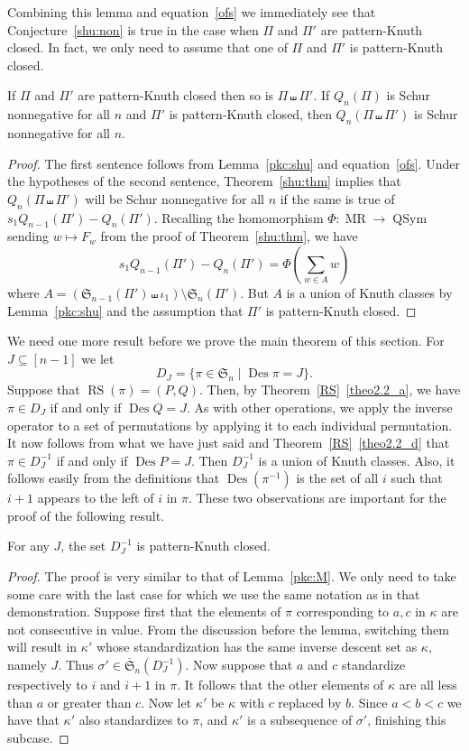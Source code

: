 \documentclass[ALCO,ThmDefs,Unicode,epreuves]{cedram}
\DeclareMathOperator{\RS}{RS}
\DeclareMathOperator{\MaR}{MR}
\newcommand{\shu}{\shuffle}
\newcommand{\ofS}{\ol{\fS}}
\newcommand{\ol}{\overline}
\newcommand{\sbe}{\subseteq}
\newcommand{\ree}[1]{\eqref{#1}}
\newcommand{\ka}{\kappa}
\newcommand{\si}{\sigma}
\newcommand{\fS}{{\mathfrak S}}
\DeclareMathOperator{\Des}{Des}
\DeclareMathOperator{\QSym}{{QSym}}
\begin{document}
Combining this lemma and equation~\ree{ofs} we immediately see that Conjecture~\ref{shu:non} is true in the case when $\Pi$ and $\Pi'$ are pattern-Knuth closed. In fact, we only need to assume that one of $\Pi$ and $\Pi'$ is pattern-Knuth closed.
\begin{prop}
If $\Pi$ and $\Pi'$ are pattern-Knuth closed then so is $\Pi\shu\Pi'$. If $Q_n(\Pi)$ is Schur nonnegative for all $n$ and $\Pi'$ is pattern-Knuth closed, then $Q_n(\Pi\shu\Pi')$ is Schur nonnegative for all $n$. %
\end{prop}

\begin{proof}
The first sentence follows from Lemma~\ref{pkc:shu} and equation~\ree{ofs}. Under the hypotheses of the second sentence, Theorem~\ref{shu:thm} implies that $Q_n(\Pi \shu \Pi')$ will be Schur nonnegative for all $n$ if the same is true of $s_1 Q_{n-1}(\Pi') - Q_n(\Pi')$. Recalling the homomorphism $\Phi : \MaR \to \QSym$ sending $w \mapsto F_w$ from the proof of Theorem~\ref{shu:thm}, we have
\[
s_1 Q_{n-1}(\Pi') - Q_n(\Pi') = \Phi\left(\sum_{w \in A} w\right)
\]
where $A = (\fS_{n-1}(\Pi') \shu \iota_1) \setminus \fS_{n}(\Pi')$. But $A$ is a union of Knuth classes by Lemma~\ref{pkc:shu} and the assumption that $\Pi'$ is pattern-Knuth closed.
\end{proof}

We need one more result before we prove the main theorem of this section. For $J\sbe [n-1]$ we let
\[
D_J =\{\pi\in\fS_n \mid \Des\pi= J\}.
\]
Suppose that $\RS(\pi)=(P,Q)$. Then, by Theorem~\ref{RS}~\eqref{theo2.2_a}, we have $\pi\in D_J$ if and only if $\Des Q= J$. As with other operations, we apply the inverse operator to a set of permutations by applying it to each individual permutation. It now follows from what we have just said and Theorem~\ref{RS}~\eqref{theo2.2_d} that $\pi\in D_J^{-1}$ if and only if $\Des P = J$. Then $D_J^{-1}$ is a union of Knuth classes. Also, it follows easily from the definitions that $\Des(\pi^{-1})$ is the set of all $i$ such that $i+1$ appears to the left of $i$ in $\pi$. These two observations are important for the proof of the following result.
\begin{lemma}
\label{DJ-1}
For any $J$, the set $D_J^{-1}$ is pattern-Knuth closed.%
\end{lemma}
\begin{proof}
The proof is very similar to that of Lemma~\ref{pkc:M}. We only need to take some care with the last case for which we use the same notation as in that demonstration. Suppose first that the elements of $\pi$ corresponding to $a,c$ in $\ka$ are not consecutive in value. From the discussion before the lemma, switching them will result in $\ka'$ whose standardization has the same inverse descent set as $\ka$, namely $J$. Thus $\si'\in\ofS_n(D_J^{-1})$. Now suppose that $a$ and $c$ standardize respectively to $i$ and $i+1$ in $\pi$. It follows that the other elements of $\ka$ are all less than $a$ or greater than $c$. Now let $\ka'$ be $\ka$ with $c$ replaced by $b$. Since $a<b<c$ we have that $\ka'$ also standardizes to $\pi$, and $\ka'$ is a subsequence of $\si'$, finishing this subcase.
\end{proof}
\end{document}

